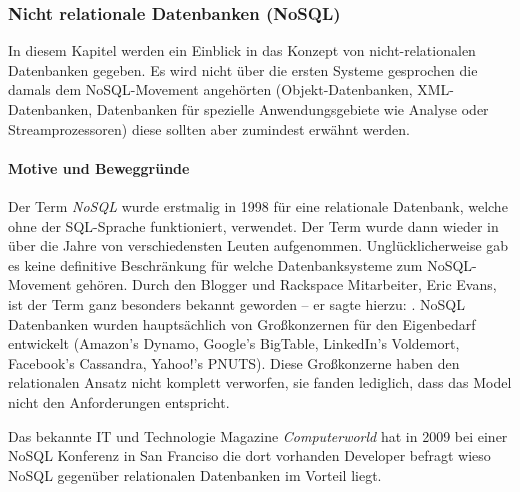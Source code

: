 \subsubsection{Nicht relationale Datenbanken (NoSQL)}
\label{subsec:nichtrelationaleDB}

In diesem Kapitel werden ein Einblick in das Konzept von nicht-relationalen Datenbanken gegeben. Es wird nicht über die ersten Systeme gesprochen die damals dem NoSQL-Movement angehörten (Objekt-Datenbanken, XML-Datenbanken, Datenbanken für spezielle Anwendungsgebiete wie Analyse oder Streamprozessoren) diese sollten aber zumindest erwähnt werden.

\paragraph{Motive und Beweggründe\newline}
Der Term \textit{NoSQL} wurde erstmalig in 1998 für eine relationale Datenbank, welche ohne der SQL-Sprache funktioniert, verwendet\cite{MELD.CH2-noSQL.firstSQLNaming}. Der Term wurde dann wieder in über die Jahre von verschiedensten Leuten aufgenommen. Unglücklicherweise gab es keine definitive Beschränkung für welche Datenbanksysteme zum NoSQL-Movement gehören. Durch den Blogger und Rackspace Mitarbeiter, Eric Evans, ist der Term ganz besonders bekannt geworden – er sagte hierzu: \cite[\textit{“the whole point of seeking alternatives is that you need to solve a problem that relational databases are a bad fit for”}]{MELD.CH2-noSQL.whatsInAName}. NoSQL Datenbanken wurden hauptsächlich von Großkonzernen für den Eigenbedarf entwickelt (Amazon’s Dynamo, Google’s BigTable, LinkedIn’s Voldemort, Facebook’s Cassandra, Yahoo!’s PNUTS). Diese Großkonzerne haben den relationalen Ansatz nicht komplett verworfen, sie fanden lediglich, dass das Model nicht den Anforderungen entspricht\cite{MELD.CH2-noSQL.capTheoremComp}.

Das bekannte IT und Technologie Magazine \textit{Computerworld} hat in 2009 bei einer NoSQL Konferenz in San Franciso die dort vorhanden Developer befragt wieso NoSQL gegenüber relationalen Datenbanken im Vorteil liegt\cite{MELD.CH2-noSQL.whyItsBetter}.

